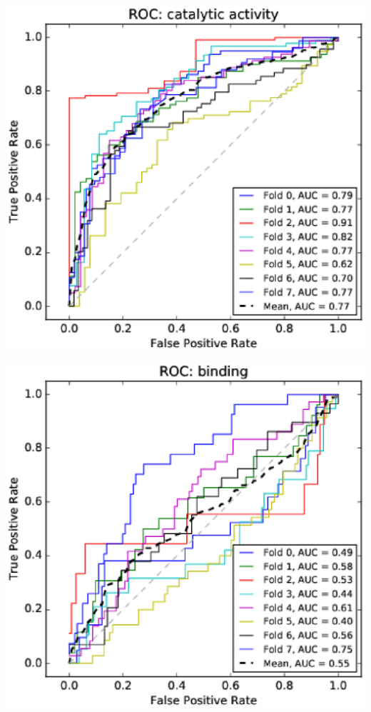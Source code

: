 \documentclass[11pt,twoside,a4paper]{book}
\newenvironment{Figure}
  {\par\medskip\noindent\minipage{\linewidth}}
  {\endminipage\par\medskip}
\begin{document}
\begin{multicols}{2}
\begin{Figure}\begin{center}\includegraphics[width=\linewidth]{figures/roc_catalytic_activity}\label{fig:roc_catalytic_activity}\end{center}\end{Figure}
\begin{Figure}\begin{center}\includegraphics[width=\linewidth]{figures/roc_binding}\label{fig:roc_binding}\end{center}\end{Figure}

\end{multicols}
\end{document}
